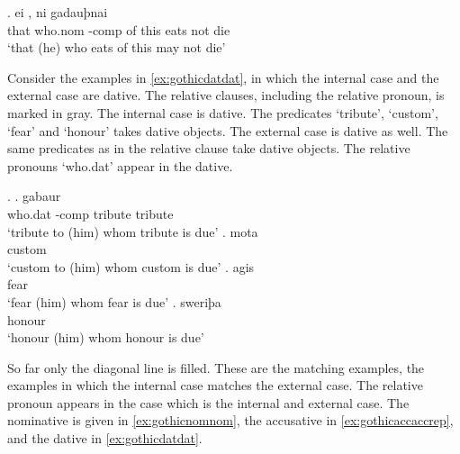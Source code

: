 \exg. ei    , ni gadauþnai\\
 that who.\ac{nom} -\ac{comp} {of this} eats\scsub{[nom]} not die\scsub{[nom]}\\
 `that (he) who eats of this may not die' \label{ex:gothicnomnom}


Consider the examples in \ref{ex:gothicdatdat}, in which the internal case and the external case are dative.
The relative clauses, including the relative pronoun, is marked in gray.
The internal case is dative. The predicates  `tribute',  `custom',  `fear' and  `honour' takes dative objects.
The external case is dative as well. The same predicates as in the relative clause take dative objects.
The relative pronouns  `who.\ac{dat}' appear in the dative.

\ex.\label{ex:gothicdatdat}
\ag.    gabaur\\
 who.\ac{dat} -\ac{comp} tribute\scsub{[dat]} tribute\scsub{[dat]}\\
 `tribute to (him) whom tribute is due'
\bg.    mota\\
    custom\scsub{[dat]}\\
 `custom to (him) whom custom is due'
\bg.    agis\\
    fear\scsub{[dat]}\\
 `fear (him) whom fear is due'
\bg.    sweriþa\\
    honour\scsub{[dat]}\\
 `honour (him) whom honour is due' 

 So far only the diagonal line is filled. These are the matching examples, the examples in which the internal case matches the external case. The relative pronoun appears in the case which is the internal and external case. The nominative is given in \ref{ex:gothicnomnom}, the accusative in \ref{ex:gothicaccaccrep}, and the dative in \ref{ex:gothicdatdat}.

